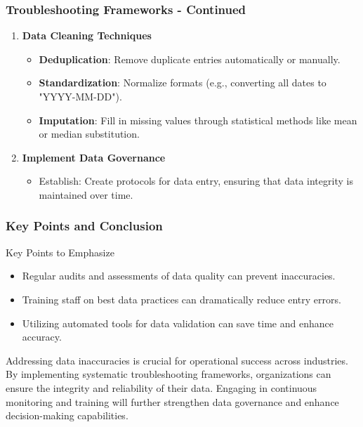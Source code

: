 \documentclass{beamer}
\begin{document}
\begin{frame}[fragile]
    \frametitle{Troubleshooting Frameworks - Continued}
    \begin{enumerate}[resume]
        \item \textbf{Data Cleaning Techniques}
        \begin{itemize}
            \item \textbf{Deduplication}: Remove duplicate entries automatically or manually.
            \item \textbf{Standardization}: Normalize formats (e.g., converting all dates to "YYYY-MM-DD").
            \item \textbf{Imputation}: Fill in missing values through statistical methods like mean or median substitution.
        \end{itemize}

        \item \textbf{Implement Data Governance}
        \begin{itemize}
            \item Establish: Create protocols for data entry, ensuring that data integrity is maintained over time.
        \end{itemize}
    \end{enumerate}
\end{frame}

\begin{frame}[fragile]
    \frametitle{Key Points and Conclusion}
    \begin{block}{Key Points to Emphasize}
        \begin{itemize}
            \item Regular audits and assessments of data quality can prevent inaccuracies.
            \item Training staff on best data practices can dramatically reduce entry errors.
            \item Utilizing automated tools for data validation can save time and enhance accuracy.
        \end{itemize}
    \end{block}
    
    Addressing data inaccuracies is crucial for operational success across industries. By implementing systematic troubleshooting frameworks, organizations can ensure the integrity and reliability of their data. Engaging in continuous monitoring and training will further strengthen data governance and enhance decision-making capabilities.
\end{frame}
\end{document}
